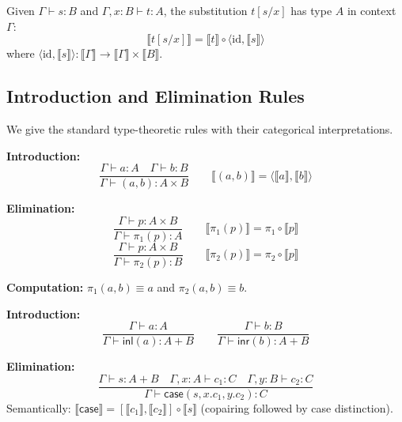 \begin{definition}[Substitution]
\label{def:substitution}
Given $\Gamma \vdash s : B$ and $\Gamma, x : B \vdash t : A$, the substitution
$t[s/x]$ has type $A$ in context $\Gamma$:
\[
  \llbracket t[s/x] \rrbracket = \llbracket t \rrbracket \circ \langle \mathrm{id}, \llbracket s \rrbracket \rangle
\]
where $\langle \mathrm{id}, \llbracket s \rrbracket \rangle : \llbracket \Gamma \rrbracket \to \llbracket \Gamma \rrbracket \times \llbracket B \rrbracket$.
\end{definition}

\subsection{Introduction and Elimination Rules}
\label{subsec:intro-elim}

We give the standard type-theoretic rules with their categorical interpretations.

\begin{definition}
\label{def:product-rules}
\textbf{Introduction:}
\[
  \frac{\Gamma \vdash a : A \quad \Gamma \vdash b : B}
       {\Gamma \vdash (a, b) : A \times B}
  \qquad
  \llbracket (a, b) \rrbracket = \langle \llbracket a \rrbracket, \llbracket b \rrbracket \rangle
\]

\textbf{Elimination:}
\[
  \frac{\Gamma \vdash p : A \times B}
       {\Gamma \vdash \pi_1(p) : A}
  \qquad
  \llbracket \pi_1(p) \rrbracket = \pi_1 \circ \llbracket p \rrbracket
\]
\[
  \frac{\Gamma \vdash p : A \times B}
       {\Gamma \vdash \pi_2(p) : B}
  \qquad
  \llbracket \pi_2(p) \rrbracket = \pi_2 \circ \llbracket p \rrbracket
\]

\textbf{Computation:} $\pi_1(a, b) \equiv a$ and $\pi_2(a, b) \equiv b$.
\end{definition}

\begin{definition}
\label{def:sum-rules}
\textbf{Introduction:}
\[
  \frac{\Gamma \vdash a : A}
       {\Gamma \vdash \mathsf{inl}(a) : A + B}
  \qquad
  \frac{\Gamma \vdash b : B}
       {\Gamma \vdash \mathsf{inr}(b) : A + B}
\]

\textbf{Elimination:}
\[
  \frac{\Gamma \vdash s : A + B \quad
        \Gamma, x : A \vdash c_1 : C \quad
        \Gamma, y : B \vdash c_2 : C}
       {\Gamma \vdash \mathsf{case}(s, x.c_1, y.c_2) : C}
\]
Semantically: $\llbracket \mathsf{case} \rrbracket = [\llbracket c_1 \rrbracket, \llbracket c_2 \rrbracket] \circ \llbracket s \rrbracket$
(copairing followed by case distinction).
\end{definition}

